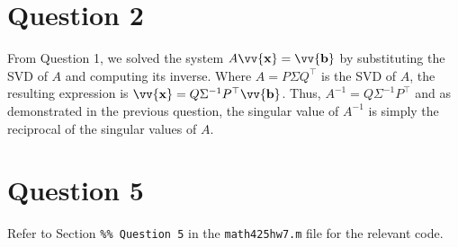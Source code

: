 \documentclass[12pt]{article}
\newcommand{\vect}[1]{\vv{\mathbf{#1}}}
\newcommand{\code}[1]{\texttt{#1}}
\begin{document}
\section*{Question 2}

From Question 1, we solved the system $A\vect{x}=\vect{b}$ by substituting the SVD of $A$ and computing its inverse. Where $A=P\Sigma Q^\top$ is the SVD of $A$, the resulting expression is $\vect{x} = Q\Sigma^{-1}P^\top\vect{b}$. Thus, $A^{-1}=Q\Sigma^{-1}P^\top$ and as demonstrated in the previous question, the singular value of $A^{-1}$ is simply the reciprocal of the singular values of $A$.

\section*{Question 5}

Refer to Section \code{\%\% Question 5} in the \code{math425hw7.m} file for the relevant code.
\end{document}
